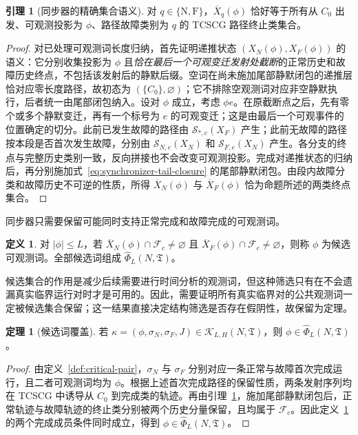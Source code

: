 \documentclass[master,fontset=ubuntu]{shnuthesis}
\theoremstyle{definition}
\newtheorem{thesisdefinition}{定义}
\newtheorem{thesislemma}{引理}
\newtheorem{thesistheorem}{定理}
\begin{document}
\begin{thesislemma}[同步器的精确集合语义]
\label{lem:synchronizer-semantics}
对 \(q\in\{\mathrm N,\mathrm F\}\)，\(\overline X_q(\phi)\) 恰好等于所有从 \(C_0\) 出发、可观测投影为 \(\phi\)、路径故障类别为 \(q\) 的 TCSCG 路径终止类集合。
\end{thesislemma}

\begin{proof}
对已处理可观测词长度归纳，首先证明递推状态 \((X_N(\phi),X_F(\phi))\) 的语义：它分别收集投影为 \(\phi\) 且\emph{恰在最后一个可观变迁发射处截断}的正常历史和故障历史终点，不包括该发射后的静默后缀。空词在尚未施加尾部静默闭包的递推层恰对应零长度路径，故初态为 \((\{C_0\},\varnothing)\)；它不排除空观测词对应非空静默执行，后者统一由尾部闭包纳入。设对 \(\phi\) 成立，考虑 \(\phi e\)。在原截断点之后，先有零个或多个静默变迁，再有一个标号为 \(e\) 的可观变迁；这是由最后一个可观事件的位置确定的切分。此前已发生故障的路径由 \(\mathscr S_{\ast,e}(X_F)\) 产生；此前无故障的路径按本段是否首次发生故障，分别由 \(\mathscr S_{N,e}(X_N)\) 和 \(\mathscr S_{F,e}(X_N)\) 产生。各分支的终点与完整历史类别一致，反向拼接也不会改变可观测投影。完成对递推状态的归纳后，再分别施加式~\eqref{eq:synchronizer-tail-closure} 的尾部静默闭包。由段内故障分类和故障历史不可逆的性质，所得 \(\overline X_N(\phi)\) 与 \(\overline X_F(\phi)\) 恰为命题所述的两类终点集合。
\end{proof}

同步器只需要保留可能同时支持正常完成和故障完成的可观测词。

\begin{thesisdefinition}
\label{def:candidate-word}
对 \(|\phi|\leq L\)，若 \(\overline X_N(\phi)\cap\mathcal F_c\neq\varnothing\) 且 \(\overline X_F(\phi)\cap\mathcal F_c\neq\varnothing\)，则称 \(\phi\) 为候选可观测词。全部候选词组成 \(\widehat\Phi_L(N,\mathfrak T)\)。
\end{thesisdefinition}

候选集合的作用是减少后续需要进行时间分析的观测词，但这种筛选只有在不会遗漏真实临界运行对时才是可用的。因此，需要证明所有真实临界对的公共观测词一定被候选集合保留；这一结果直接决定结构筛选是否存在假阴性，故保留为定理。

\begin{thesistheorem}[候选词覆盖]
\label{thm:candidate-coverage}
若 \(\kappa=(\phi,\sigma_N,\sigma_F,J)\in\mathcal K_{L,H}(N,\mathfrak T)\)，则 \(\phi\in\widehat\Phi_L(N,\mathfrak T)\)。
\end{thesistheorem}

\begin{proof}
由定义~\ref{def:critical-pair}，\(\sigma_N\) 与 \(\sigma_F\) 分别对应一条正常与故障首次完成运行，且二者可观测词均为 \(\phi\)。根据上述首次完成路径的保留性质，两条发射序列均在 TCSCG 中诱导从 \(C_0\) 到完成类的轨迹。再由引理~\ref{lem:synchronizer-semantics}，施加尾部静默闭包后，正常轨迹与故障轨迹的终止类分别被两个历史分量保留，且均属于 \(\mathcal F_c\)。因此定义~\ref{def:candidate-word} 的两个完成成员条件同时成立，得到 \(\phi\in\widehat\Phi_L(N,\mathfrak T)\)。
\end{proof}
\end{document}
